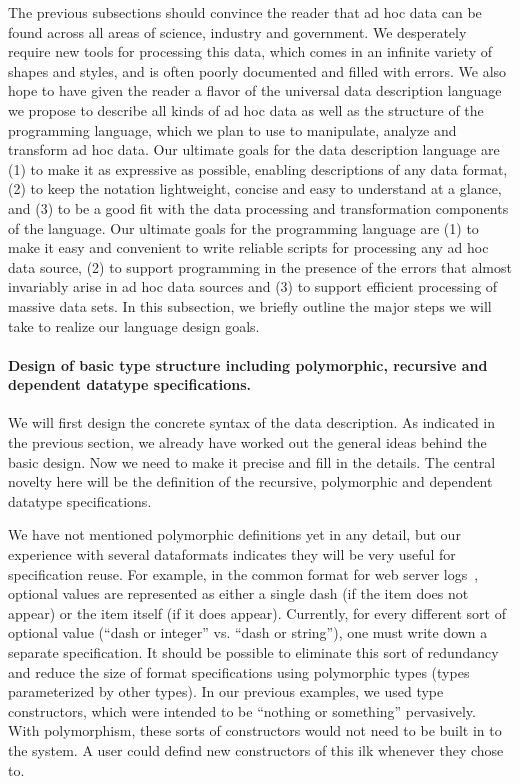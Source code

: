 \documentclass[11pt]{article}
\begin{document}
The previous subsections should convince the reader 
that ad hoc data can be found across all areas of science,
industry and government.  We desperately require new tools for processing
this data, which comes in an infinite variety of shapes and styles,
and is often poorly documented and filled with errors.  We also hope to
have given the reader a flavor of the
universal data description language we propose to describe
all kinds of ad hoc data as well as the structure of
the \datatype{} programming language, which we plan to use to
manipulate, analyze and transform ad hoc data.
Our ultimate goals for the data description language are (1) to make it
as expressive as possible, enabling descriptions of
any data format, (2) to keep the notation lightweight, 
concise and easy to understand at a glance, and (3)
to be a good fit with the data processing and
transformation components of the \datatype{} language.
Our ultimate goals for the \datatype{} programming language
are (1) to make it easy and convenient to write reliable
scripts for processing any ad hoc data source, (2)
to support programming in the presence of the errors that
almost invariably arise in ad hoc data sources and (3)
to support efficient processing of massive data sets.
In this subsection, we briefly outline the major steps
we will take to realize our language design goals.

\paragraph*{Design of basic type structure including 
polymorphic, recursive and dependent datatype specifications.}
We will first design the concrete syntax of the data description.
As indicated in the previous section, we already have worked
out the general ideas behind the basic design.  Now we need to make 
it precise and fill in the details.  The central novelty
here will be the definition of the recursive, polymorphic
and dependent datatype specifications.

We have not mentioned polymorphic definitions yet in any detail,
but our experience with several dataformats indicates
they will be very useful for specification reuse.  
For example, in the common format for web server logs~\cite{wpp}, optional
values are represented as either a single dash (if the item does not
appear) or the item itself (if it does appear).  Currently, for every
different sort of optional value (\ie ``dash or integer'' vs. ``dash
or string''), one must write down a separate specification.  It should
be possible to eliminate this sort of redundancy and reduce the size
of format specifications using polymorphic types (types parameterized
by other types).  In our previous examples, we used
{} type constructors, which were intended to be
``nothing or something'' pervasively.  With polymorphism,
these sorts of constructors would not need to be built in to the
system.  A user could defind new constructors of this ilk 
whenever they chose to.
\end{document}
